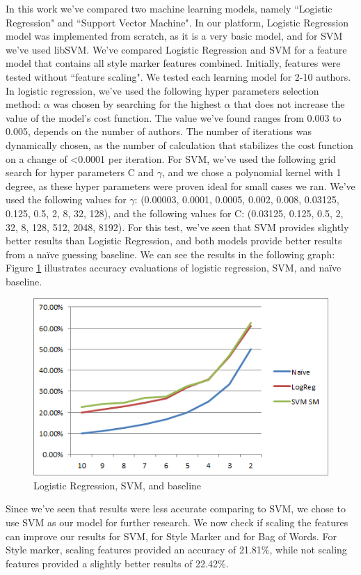\documentclass[a4paper]{article}
\begin{document}
In this work we've compared two machine learning models, namely ``Logistic Regression" and ``Support Vector Machine".
In our platform, Logistic Regression model was implemented from scratch, as it is a very basic model, and for SVM we've used libSVM\cite{chang}.
We've compared Logistic Regression and SVM for a feature model that contains all style marker features combined.
Initially, features were tested without ``feature scaling".
We tested each learning model for 2-10 authors.
In logistic regression, we've used the following hyper parameters selection method:
$\alpha$ was chosen by searching for the highest $\alpha$ that does not increase the value of the model's cost function. The value we've found ranges from 0.003 to 0.005, depends on the number of authors.
The number of iterations was dynamically chosen, as the number of calculation that stabilizes the cost function on a change of \textless 0.0001 per iteration.
For SVM, we've used the following grid search for hyper parameters C and $\gamma$, and we chose a polynomial kernel with 1 degree, as these hyper parameters were proven ideal for small cases we ran.
We've used the following values for $\gamma$: (0.00003, 0.0001, 0.0005, 0.002, 0.008, 0.03125, 0.125, 0.5, 2, 8, 32, 128), and the following values for C: (0.03125, 0.125, 0.5, 2, 32, 8, 128, 512, 2048, 8192).
For this test, we've seen that SVM provides slightly better results than Logistic Regression, and both models provide better results from a na\"ive guessing baseline. We can see the results in the following graph:
Figure \ref{fig:LR vs. SVM} illustrates accuracy evaluations of logistic regression, SVM, and na\"ive baseline.
\begin{figure}[!h]
	\centering
	\includegraphics[width=.5\textwidth]{"figures/lrvssvm"}
	\caption{Logistic Regression, SVM, and baseline}
		\label{fig:LR vs. SVM}
\end{figure}
Since we've seen that results were less accurate comparing to SVM, we chose to use SVM as our model for further research.
We now check if scaling the features can improve our results for SVM, for Style Marker and for Bag of Words.
For Style marker, scaling features provided an accuracy of 21.81\%, while not scaling features provided a slightly better results of 22.42\%.
\end{document}
